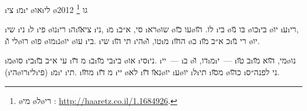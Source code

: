 \textheader%
{\i{צי} \i{מ}\i{י}  }
{\o{או}\i{לי} \o{גו}}
{}
{\footnote{\o{מי} \o{ל}\o{רי} : \url{http://haaretz.co.il/1.1684926}.}}
{}
{}
{2012}

\i{שי}  \i{ני} \i{ל} \i{פי} \o{נו}\i{רי} \i{ה}\i{צי}\u{או} \i{ני}, \i{מ} \i{סי},  א״ב \i{רא}\o{שו} \o{עו} \u{כו}\o{לו}. \u{הו} \i{בי}  \o{בּו} \u{נו} \o{כו}\i{בי}  \o{יו} \i{ע}\i{רי}, \i{לי} \u{ו}\o{רו} \o{פו} \o{מו}\i{נ}\o{יו}  \o{עו} \i{בי}. \i{שי} \i{תי} \u{הו}     \i{הי}\o{טו}, \u{ו}\i{מ} \i{ה}\u{חו} \o{כ} \i{כ} א״ב \u{מו}\i{רי} \u{נו} \o{יו}.

\i{מ}\o{סו}  \i{בי}\i{עי}   א״ב \u{בו} \i{מ} \u{דו} \i{ב}\i{בי} \u{מו}\i{בי}  \o{או} \i{סי}\i{ני}.  \i{יי}~— \i{ב} \o{דו}, \u{ו}\i{מ}\i{י}~— \i{ב} \u{טו}\i{מי}, \u{הוא}  \u{מו}\o{נו} (\i{הי}\o{רו}\i{לי}\i{פי})  \i{מ}\i{י} \i{תי}. \i{מ}\u{חו} \i{מ} \u{דו} \i{יי} \o{לא} \i{נ}\u{או} \u{דו}\o{יו}  \i{ע}\o{יו} \i{ל}\i{תי} \i{מ}\u{סו} \o{כ}\u{הו}   \i{ני} לפנה״ס.

